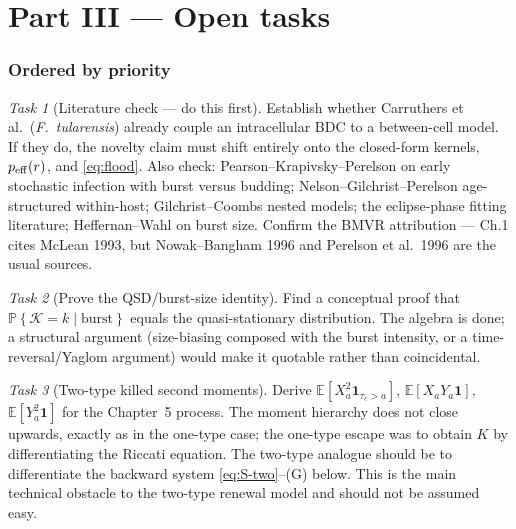 \documentclass[11pt]{article}
\newcommand{\E}{\mathbb{E}}
\newcommand{\Prob}[1]{\mathbb{P}\!\left\{#1\right\}}
\newcommand{\Kb}{\mathcal{K}}
\theoremstyle{plain}
\theoremstyle{definition}
\theoremstyle{remark}
\newtheorem{task}{Task}
\begin{document}
\part*{Part III --- Open tasks}

\section{Ordered by priority}

\begin{task}[Literature check --- do this first]
\label{task:lit}
Establish whether Carruthers et al.\ (\textit{F.~tularensis}) already couple an
intracellular BDC to a between-cell model. If they do, the novelty claim must shift
entirely onto the closed-form kernels, $p_{\rm eff}(r)$, and \eqref{eq:flood}. Also
check: Pearson--Krapivsky--Perelson on early stochastic infection with burst versus
budding; Nelson--Gilchrist--Perelson age-structured within-host; Gilchrist--Coombs
nested models; the eclipse-phase fitting literature; Heffernan--Wahl on burst size.
Confirm the BMVR attribution --- Ch.1 cites McLean 1993, but Nowak--Bangham 1996 and
Perelson et al.\ 1996 are the usual sources.
\end{task}

\begin{task}[Prove the QSD/burst-size identity]
\label{task:qsdburst}
Find a conceptual proof that $\Prob{\Kb=k\mid\text{burst}}$ equals the quasi-stationary
distribution. The algebra is done; a structural argument (size-biasing composed with the
burst intensity, or a time-reversal/Yaglom argument) would make it quotable rather than
coincidental.
\end{task}

\begin{task}[Two-type killed second moments]
\label{task:twotypemoments}
Derive $\E[X_a^2\mathbf 1_{\tau_c>a}]$, $\E[X_aY_a\mathbf 1]$, $\E[Y_a^2\mathbf 1]$ for
the Chapter~5 process. The moment hierarchy does not close upwards, exactly as in the
one-type case; the one-type escape was to obtain $K$ by differentiating the Riccati
equation. The two-type analogue should be to differentiate the backward system
\eqref{eq:S-two}--(G) below. This is the main technical obstacle to the two-type
renewal model and should not be assumed easy.
\end{task}
\end{document}
